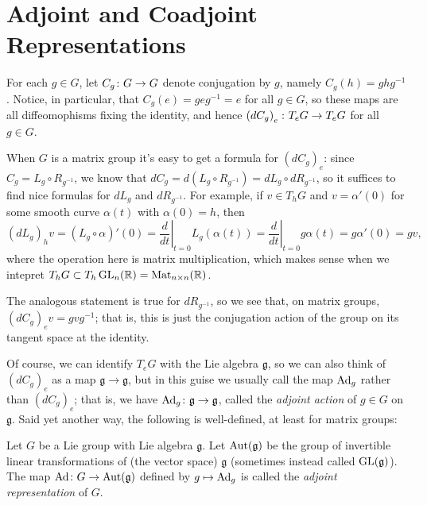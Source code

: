 
\section{Adjoint and Coadjoint Representations}
\label{sec:adjoint representations}

For each $g \in G$, let $C_g \colon\thinspace\! G \to G$ denote conjugation by $g$, namely $C_g(h) = ghg^{-1}$. Notice, in particular, that $C_g(e) = geg^{-1} = e$ for all $g \in G$, so these maps are all diffeomophisms fixing the identity, and hence $\left(dC_g\right)_e \colon\thinspace\! T_e G \to T_e G$ for all $g \in G$. 

When $G$ is a matrix group it's easy to get a formula for $\left(dC_g\right)_e$: since $C_g = L_g \circ R_{g^{-1}}$, we know that $dC_g = d(L_g \circ R_{g^{-1}}) = dL_g \circ dR_{g^{-1}}$, so it suffices to find nice formulas for $dL_g$ and $dR_{g^{-1}}$. For example, if $v \in T_h G$ and $v = \alpha'(0)$ for some smooth curve $\alpha(t)$ with $\alpha(0)=h$, then
\[
	\left(dL_g\right)_h v = \left(L_g \circ \alpha\right)'(0) = \left. \frac{d}{dt} \right|_{t=0} L_g(\alpha(t)) = \left. \frac{d}{dt} \right|_{t=0} g\alpha(t) = g\alpha'(0) = gv,
\]
where the operation here is matrix multiplication, which makes sense when we intepret $T_hG \subset T_h \operatorname{GL}_n(\mathbb{R}) = \operatorname{Mat}_{n \times n}(\mathbb{R})$.

The analogous statement is true for $dR_{g^{-1}}$, so we see that, on matrix groups, $\left(dC_g\right)_ev = gvg^{-1}$; that is, this is just the conjugation action of the group on its tangent space at the identity.

Of course, we can identify $T_eG$ with the Lie algebra $\mathfrak{g}$, so we can also think of $\left(dC_g\right)_e$ as a map $\mathfrak{g} \to \mathfrak{g}$, but in this guise we usually call the map $\operatorname{Ad}_g$ rather than $\left(dC_g\right)_e$; that is, we have $\operatorname{Ad}_g \colon\thinspace\! \mathfrak{g} \to \mathfrak{g}$, called the \emph{adjoint action} of $g \in G$ on $\mathfrak{g}$. Said yet another way, the following is well-defined, at least for matrix groups:

\begin{definition}\label{def:adjoint representation}
	Let $G$ be a Lie group with Lie algebra $\mathfrak{g}$. Let $\operatorname{Aut}(\mathfrak{g})$ be the group of invertible linear transformations of (the vector space) $\mathfrak{g}$ (sometimes instead called $\operatorname{GL}(\mathfrak{g})$). The map $\operatorname{Ad} \colon\thinspace\! G \to \operatorname{Aut}(\mathfrak{g})$ defined by $g \mapsto \operatorname{Ad}_g$ is called the \emph{adjoint representation} of $G$.
\end{definition}

